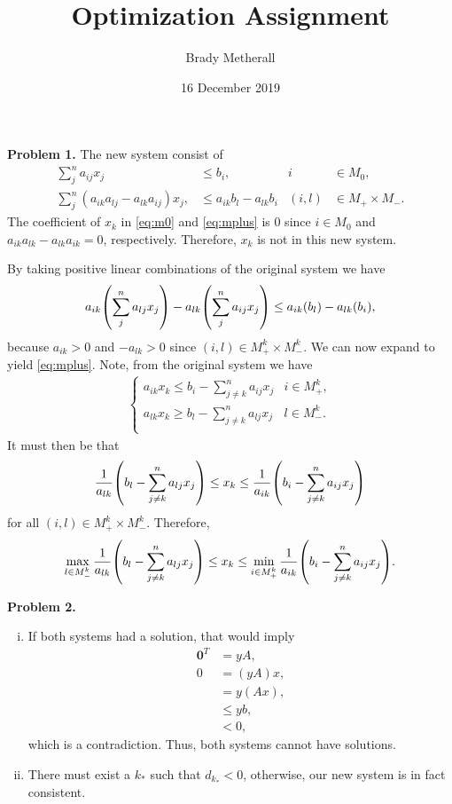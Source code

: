 \documentclass[11pt,a4paper]{article}
\title{Optimization Assignment}
\author{Brady Metherall}
\date{16 December 2019}
\let\originalleft\left
\let\originalright\right
\renewcommand{\left}{\mathopen{}\mathclose\bgroup\originalleft}
\renewcommand{\right}{\aftergroup\egroup\originalright}
\begin{document}
\maketitle


\textbf{Problem 1.}
The new system consist of
\begin{align}
    \sum_j^n a_{ij} x_j &\leq b_i, & i &\in M_0, \label{eq:m0} \\
    \sum_j^n (a_{ik} a_{lj} - a_{lk} a_{ij}) x_j, &\leq a_{ik} b_l - a_{lk} b_i & (i,l) &\in M_+ \times M_-. \label{eq:mplus}
\end{align}
The coefficient of $x_k$ in \eqref{eq:m0} and \eqref{eq:mplus} is 0 since $i \in M_0$ and $a_{ik} a_{lk} - a_{lk} a_{ik} = 0$, respectively. Therefore, $x_k$ is not in this new system.

By taking positive linear combinations of the original system we have
\begin{align}
    a_{ik} \left( \sum_j^n a_{lj} x_j \right) - a_{lk} \left( \sum_j^n a_{ij} x_j \right) \leq a_{ik} \left( b_l \right) - a_{lk} \left( b_i \right),
\end{align}
because $a_{ik} > 0$ and $-a_{lk} > 0$ since $(i, l) \in M_+^k \times M_-^k$. We can now expand to yield \eqref{eq:mplus}. Note, from the original system we have
\begin{align}
    \begin{cases}
        \displaystyle a_{ik} x_k \leq b_i - \sum_{j \neq k}^n a_{ij} x_j & i \in M_+^k, \\
        \displaystyle a_{lk} x_k \geq b_l - \sum_{j \neq k}^n a_{lj} x_j & l \in M_-^k. \\
    \end{cases}
\end{align}
It must then be that
\begin{align}
    \frac{1}{a_{lk}} \left( b_l - \sum_{j \neq k}^n a_{lj} x_j \right) \leq x_k \leq \frac{1}{a_{ik}} \left( b_i - \sum_{j \neq k}^n a_{ij} x_j \right)
\end{align}
for all $(i, l) \in M_+^k \times M_-^k$. Therefore,
\begin{align}
    \max_{l \in M_-^k} \frac{1}{a_{lk}} \left( b_l - \sum_{j \neq k}^n a_{lj} x_j \right) \leq x_k \leq \min_{i \in M_+^k} \frac{1}{a_{ik}} \left( b_i - \sum_{j \neq k}^n a_{ij} x_j \right).
\end{align}

\textbf{Problem 2.}
\begin{enumerate}[i)]
    \item
    If both systems had a solution, that would imply
    \begin{align*}
        \mathbf{0}^T &= yA, \\
        0 &= (y A) x, \\
        &= y (A x), \\
        &\leq yb, \\
        &< 0,
    \end{align*}
    which is a contradiction. Thus, both systems cannot have solutions.
    \item
    There must exist a $k_*$ such that $d_{k_*} < 0$, otherwise, our new system is in fact consistent.
\end{enumerate}
\end{document}
